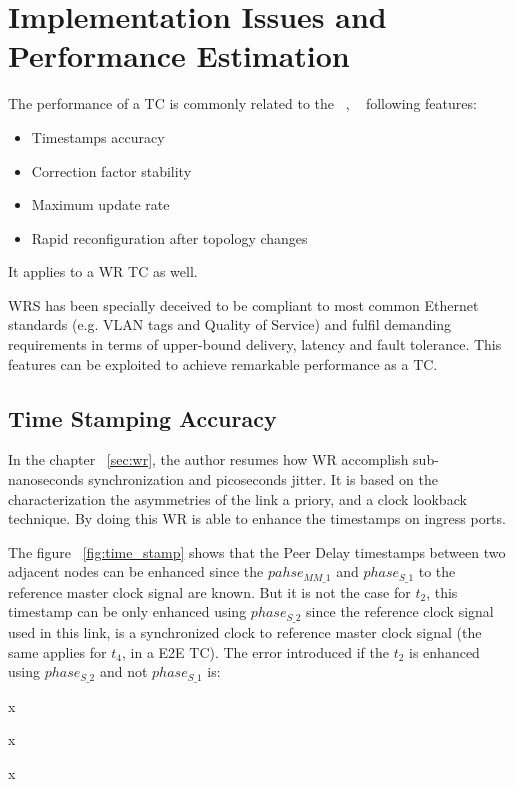 \section{Implementation Issues and Performance Estimation}
\label{sec:issues}
The performance of a TC is commonly related to the ~\cite{biblio:tc_perf},
~\cite{biblio:tc_perf_2} following features: 

\begin{itemize}
    \item Timestamps accuracy 
    \item Correction factor stability
    \item Maximum update rate
    \item Rapid reconfiguration after topology changes
\end{itemize}

It applies to a WR TC as well.



WRS has been specially deceived to be compliant to most
common Ethernet standards (e.g. VLAN tags and Quality of Service) and fulfil demanding 
requirements in terms of upper-bound delivery, latency and fault tolerance. 
This features can be exploited to achieve remarkable performance as a TC.

\subsection{Time Stamping Accuracy}

In the chapter ~\ref{sec:wr}, the author resumes how WR accomplish
sub-nanoseconds synchronization and picoseconds jitter. It is based on the
characterization the asymmetries of the link a priory, and a clock lookback
technique. By doing this WR is able to  enhance the timestamps on ingress ports. 

The figure ~\ref{fig:time_stamp} shows that the Peer Delay timestamps between two 
adjacent nodes can be enhanced since the $pahse_{MM\_1}$ and $phase_{S\_1}$ to
the reference master clock signal are known. But it is not the case for $t_{2}$, 
this timestamp can be only enhanced using $phase_{S\_2}$ since the reference clock 
signal used in this link, is a synchronized clock to reference master clock signal 
(the same applies for $t_{4}$, in a E2E TC). The error introduced if the $t_{2}$ is 
enhanced using $phase_{S\_2}$ and not $phase_{S\_1}$ is:

x

x

x

